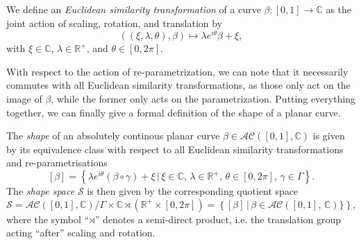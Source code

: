 \begin{definition} 
  We define an \emph{Euclidean similarity transformation} of a curve $\beta : [0,1] \rightarrow \mathbb{C}$ as the joint action of scaling, rotation, and translation by
  $$((\xi, \lambda, \theta), \beta) \mapsto \lambda e^{i\theta} \beta + \xi,$$
  with $\xi \in \mathbb{C}$, $\lambda \in \mathbb{R}^+$, and $\theta \in [0,2\pi]$.
\end{definition}

\noindent With respect to the action of re-parametrization, we can note that it necessarily commutes with all Euclidean similarity transformations, as those only act on the image of $\beta$, while the former only acts on the parametrization.
Putting everything together, we can finally give a formal definition of the shape of a planar curve.

\begin{definition}[Shape]
  The \emph{shape} of an absolutely continous planar curve $\beta \in \mathcal{AC}([0,1], \mathbb{C})$ is given by its equivalence class with respect to all Euclidean similarity transformations and re-parametrisations
  $$ [\beta] = \left\{\lambda e^{i\theta}(\beta \circ \gamma) + \xi\,|\, \xi \in \mathbb{C},\, \lambda \in \mathbb{R}^+,\, \theta \in [0,2\pi],\, \gamma \in \Gamma\right\}. $$
  The \emph{shape space} $\mathcal{S}$ is then given by the corresponding quotient space 
  $$\mathcal{S} = \mathcal{AC}([0,1], \mathbb{C}) \big/ \Gamma \times \mathbb{C} \rtimes \left( \mathbb{R}^+ \times [0,2\pi] \right) = \left\{[\beta]\,|\,\beta \in \mathcal{AC}([0,1],\, \mathbb{C})\}\right\},$$
  where the symbol \enquote{$\rtimes$} denotes a semi-direct product, i.e. the translation group acting \enquote{after} scaling and rotation. 
\end{definition}


